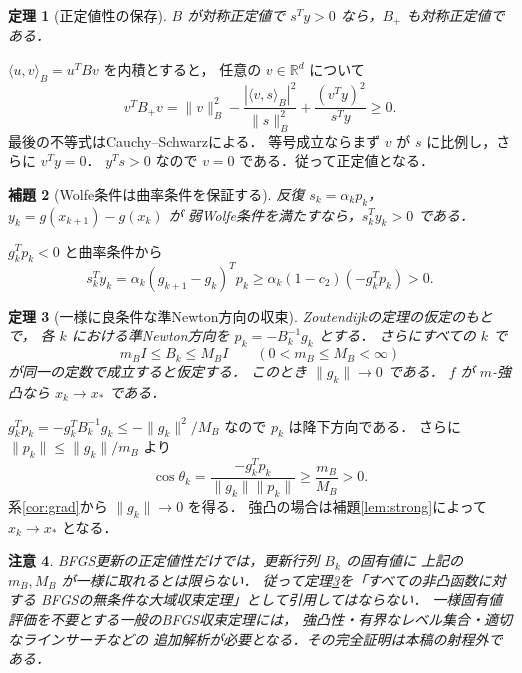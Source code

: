 \documentclass[a5paper,10pt,onecolumn]{jsarticle}
\makeatletter
\theoremstyle{mathnotetheorem}
\newtheorem{theorem}{定理}[section]
\newtheorem{lemma}[theorem]{補題}
\newtheorem{remark}[theorem]{注意}
\renewcommand{\proofname}{証明}
\renewenvironment{proof}[1][\proofname]{%
  \par\pushQED{\qed}\normalfont\topsep4\p@\@plus2\p@\relax
  \trivlist\item[\hskip\labelsep\bfseries #1]\ignorespaces
}{\popQED\endtrivlist\@endpefalse}
\newcommand{\norm}[1]{\lVert #1\rVert}
\makeatother
\begin{document}
\begin{theorem}[正定値性の保存]\label{thm:spd}
$B$ が対称正定値で $s^Ty>0$ なら，$B_+$ も対称正定値である．
\end{theorem}
\begin{proof}
$\langle u,v\rangle_B=u^TBv$ を内積とすると，
任意の $v\in\mathbb R^d$ について
\[
 v^TB_+v=\norm v_B^2-
     \frac{|\langle v,s\rangle_B|^2}{\norm s_B^2}
     +\frac{(v^Ty)^2}{s^Ty}\ge0.
\]
最後の不等式はCauchy--Schwarzによる．
等号成立ならまず $v$ が $s$ に比例し，さらに $v^Ty=0$．
$y^Ts>0$ なので $v=0$ である．従って正定値となる．
\end{proof}

\begin{lemma}[Wolfe条件は曲率条件を保証する]\label{lem:curv}
反復 $s_k=\alpha_kp_k$，
$y_k=g(x_{k+1})-g(x_k)$ が
弱Wolfe条件を満たすなら，$s_k^Ty_k>0$ である．
\end{lemma}
\begin{proof}
$g_k^Tp_k<0$ と曲率条件から
\[
 s_k^Ty_k=\alpha_k(g_{k+1}-g_k)^Tp_k
 \ge\alpha_k(1-c_2)(-g_k^Tp_k)>0.
\]
\end{proof}

\begin{theorem}[一様に良条件な準Newton方向の収束]\label{thm:qn}
Zoutendijkの定理の仮定のもとで，
各 $k$ における準Newton方向を
$p_k=-B_k^{-1}g_k$ とする．
さらにすべての $k$ で
\[
 m_BI\le B_k\le M_BI
 \qquad(0<m_B\le M_B<\infty)
\]
が同一の定数で成立すると仮定する．
このとき $\norm{g_k}\to0$ である．
$f$ が $m$-強凸なら $x_k\to x_*$ である．
\end{theorem}
\begin{proof}
$g_k^Tp_k=-g_k^TB_k^{-1}g_k\le-\norm{g_k}^2/M_B$ なので
$p_k$ は降下方向である．
さらに $\norm{p_k}\le\norm{g_k}/m_B$ より
\[
 \cos\theta_k=\frac{-g_k^Tp_k}{\norm{g_k}\norm{p_k}}
 \ge\frac{m_B}{M_B}>0.
\]
系\ref{cor:grad}から $\norm{g_k}\to0$ を得る．
強凸の場合は補題\ref{lem:strong}によって $x_k\to x_*$ となる．
\end{proof}

\begin{remark}
BFGS更新の正定値性だけでは，更新行列 $B_k$ の固有値に
上記の $m_B,M_B$ が一様に取れるとは限らない．
従って定理\ref{thm:qn}を「すべての非凸函数に対する
BFGSの無条件な大域収束定理」として引用してはならない．
一様固有値評価を不要とする一般のBFGS収束定理には，
強凸性・有界なレベル集合・適切なラインサーチなどの
追加解析が必要となる．その完全証明は本稿の射程外である．
\end{remark}
\end{document}
